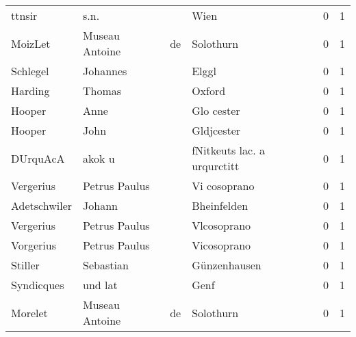 \begin{tabular}{llllrr}
                   ttnsir &                               s.n. &             &                                        Wien &          0 &         1 \\
                  MoizLet &                     Museau Antoine &          de &                                   Solothurn &          0 &         1 \\
                 Schlegel &                           Johannes &             &                                       Elggl &          0 &         1 \\
                  Harding &                             Thomas &             &                                      Oxford &          0 &         1 \\
                   Hooper &                               Anne &             &                                  Glo cester &          0 &         1 \\
                   Hooper &                               John &             &                                  Gldjcester &          0 &         1 \\
                 DUrquAcA &                             akok u &             &                 fNitkeuts lac. a urqurctitt &          0 &         1 \\
                Vergerius &                      Petrus Paulus &             &                                Vi cosoprano &          0 &         1 \\
             Adetschwiler &                             Johann &             &                                 Bheinfelden &          0 &         1 \\
                Vergerius &                      Petrus Paulus &             &                                 Vlcosoprano &          0 &         1 \\
                Vorgerius &                      Petrus Paulus &             &                                 Vicosoprano &          0 &         1 \\
                  Stiller &                          Sebastian &             &                                Günzenhausen &          0 &         1 \\
               Syndicques &                            und lat &             &                                        Genf &          0 &         1 \\
                  Morelet &                     Museau Antoine &          de &                                   Solothurn &          0 &         1 \\

\end{tabular}
